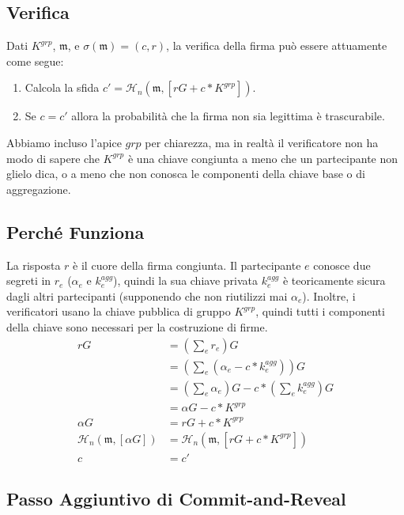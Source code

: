 \subsection*{Verifica}

Dati $K^{grp}$, $\mathfrak{m}$, e $\sigma(\mathfrak{m}) = (c,r)$, la verifica della firma può essere attuamente come segue:
\begin{enumerate}
    \item Calcola la sfida $c' = \mathcal{H}_n(\mathfrak{m},[r G + c*K^{grp}])$.
    \item Se $c = c'$ allora la probabilità che la firma non sia legittima è trascurabile.
\end{enumerate}

Abbiamo incluso l'apice $grp$ per chiarezza, ma in realtà il verificatore non ha modo di sapere che $K^{grp}$ è una chiave congiunta a meno che un partecipante non glielo dica, o a meno che non conosca le componenti della chiave base o di aggregazione.


\subsection*{Perché Funziona}

La risposta $r$ è il cuore della firma congiunta. Il partecipante $e$ conosce due segreti in $r_e$ ($\alpha_e$ e $k^{agg}_e$), quindi la sua chiave privata $k^{agg}_e$ è teoricamente sicura dagli altri partecipanti (supponendo che non riutilizzi mai $\alpha_e$). Inoltre, i verificatori usano la chiave pubblica di gruppo $K^{grp}$, quindi tutti i componenti della chiave sono necessari per la costruzione di firme.
\begin{align*}
    r G &= (\sum_e r_e) G \\
      &= (\sum_e (\alpha_e - c*k^{agg}_e)) G \\
      &= (\sum_e \alpha_e) G - c*(\sum_e k^{agg}_e) G \\
      &= \alpha G - c*K^{grp} \\
    \alpha G &= r G + c*K^{grp} \\
    \mathcal{H}_n(\mathfrak{m},[\alpha G]) &= \mathcal{H}_n(\mathfrak{m},[r G + c*K^{grp}]) \\
    c &= c'
\end{align*}


\subsection*{Passo Aggiuntivo di Commit-and-Reveal}

